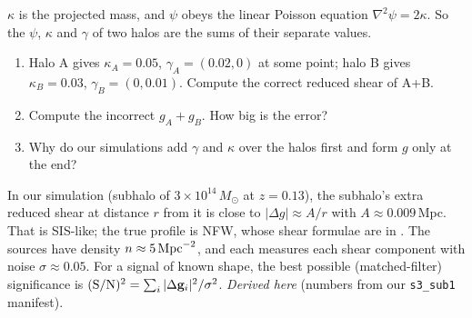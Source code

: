 

\begin{given}
$\kappa$ is the projected mass, and $\psi$ obeys the linear Poisson equation $\nabla^2\psi = 2\kappa$. So the $\psi$,
$\kappa$ and $\gamma$ of two halos are the sums of their separate values.
\end{given}


\begin{enumerate}
  \item Halo A gives $\kappa_A = 0.05$, $\gamma_A = (0.02, 0)$ at some point; halo B gives $\kappa_B = 0.03$,
    $\gamma_B = (0, 0.01)$. Compute the correct reduced shear of A+B.
  \item Compute the incorrect $g_A + g_B$. How big is the error?
  \item Why do our simulations add $\gamma$ and $\kappa$ over the halos first and form $g$ only at the end?
\end{enumerate}



\begin{given}
In our simulation (subhalo of $3\times10^{14}\,M_\odot$ at $z = 0.13$), the subhalo's extra reduced shear at distance $r$
from it is close to $|\Delta g| \approx A/r$ with $A \approx 0.009$\,Mpc. That is SIS-like; the true profile is NFW,
whose shear formulae are in \cWBnfw. The sources have density $n \approx 5\,{\rm Mpc}^{-2}$, and each measures each
shear component with noise $\sigma \approx 0.05$. For a signal of known shape, the best possible (matched-filter)
significance is $({\rm S/N})^2 = \sum_i |\Delta\mathbf{g}_i|^2/\sigma^2$. \emph{Derived here} (numbers from our
\texttt{s3\_sub1} manifest).
\end{given}

